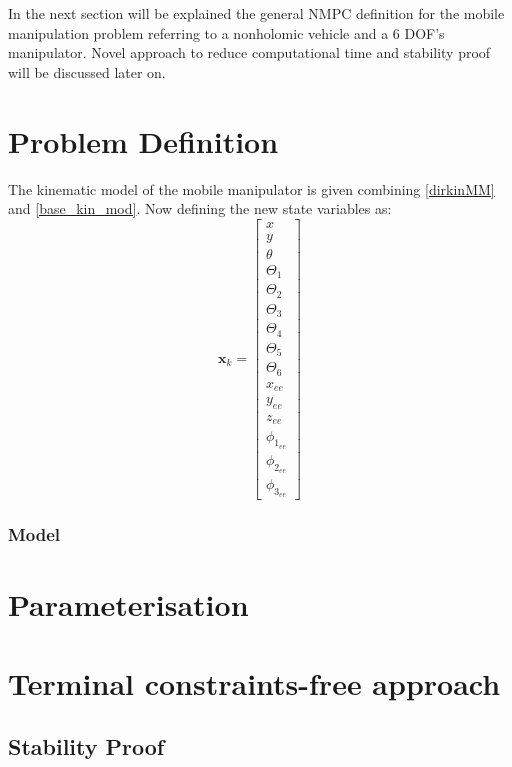 In the next section will be explained the general NMPC definition for the mobile manipulation problem referring to a nonholomic vehicle and a 6 DOF's manipulator. Novel approach to reduce computational time and stability proof will be discussed later on.

\section{Problem Definition}

The kinematic model of the mobile manipulator is given combining \ref{dirkinMM} and \ref{base_kin_mod}. Now defining the new state variables as:
\begin{equation}
\textbf{x}_{k} = \left[ \begin{matrix} x \\ y \\ \theta \\ \Theta_1 \\ \Theta_2 \\ \Theta_3 \\ \Theta_4 \\ \Theta_5 \\ \Theta_6 \\ x_{ee} \\ y_{ee} \\ z_{ee} \\ \phi_{1_{ee}} \\ \phi_{2_{ee}} \\ \phi_{3_{ee}} 
\end{matrix} \right]
\end{equation}

\subsubsection{Model}

\section{Parameterisation}

\section{Terminal constraints-free approach}

\subsection{Stability Proof}